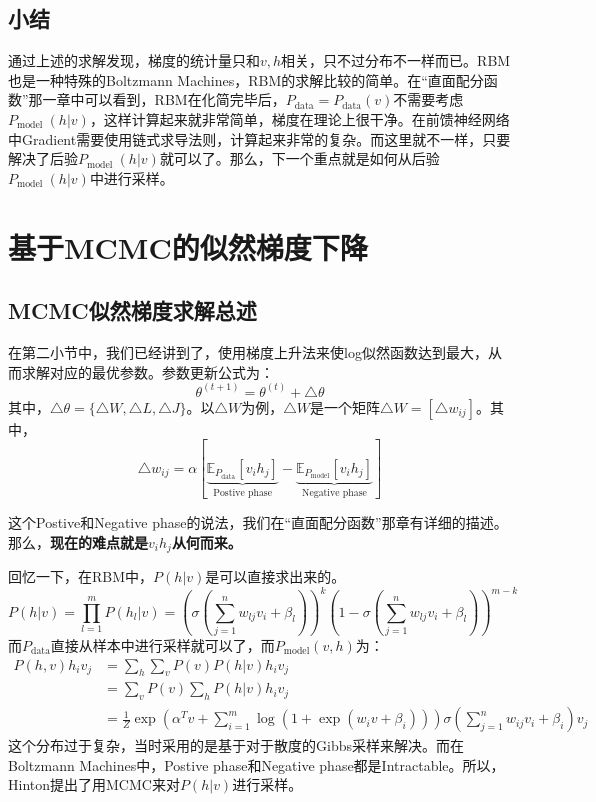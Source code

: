 \documentclass[a4paper]{article}
\begin{document}
\subsection{小结}
通过上述的求解发现，梯度的统计量只和$v,h$相关，只不过分布不一样而已。RBM也是一种特殊的Boltzmann Machines，RBM的求解比较的简单。在“直面配分函数”那一章中可以看到，RBM在化简完毕后，$P_{\text{data}} =P_{\text{data}} (v)$不需要考虑$P_{\text {model }}(h | v)$，这样计算起来就非常简单，梯度在理论上很干净。在前馈神经网络中Gradient需要使用链式求导法则，计算起来非常的复杂。而这里就不一样，只要解决了后验$P_{\text {model }}(h | v)$就可以了。那么，下一个重点就是如何从后验$P_{\text {model }}(h | v)$中进行采样。

\section{基于MCMC的似然梯度下降}
\subsection{MCMC似然梯度求解总述}
在第二小节中，我们已经讲到了，使用梯度上升法来使log似然函数达到最大，从而求解对应的最优参数。参数更新公式为：
\begin{equation}
    \theta^{(t+1)} = \theta^{(t)} + \triangle \theta
\end{equation}
其中，$\triangle \theta = \{ \triangle W, \triangle L, \triangle J \}$。以$\triangle W$为例，$\triangle W$是一个矩阵$\triangle W = [\triangle w_{ij}]$。其中，
\begin{equation}
    \triangle w_{ij} = \alpha \left[ \underbrace{\mathbb{E}_{P_{\text{data}}}[v_ih_j]}_{\text{Postive phase}} - \underbrace{\mathbb{E}_{P_{\text{model}}}[v_ih_j]}_{\text{Negative phase}} \right]
\end{equation}

这个Postive和Negative phase的说法，我们在“直面配分函数”那章有详细的描述。那么，\textbf{现在的难点就是$v_ih_j$从何而来。}

回忆一下，在RBM中，$P(h | v)$是可以直接求出来的。
\begin{equation}
P(h | v)=\prod_{l=1}^{m} P\left(h_{l} | v\right)=\left(\sigma\left(\sum_{j=1}^{n} w_{l j} v_{i}+\beta_{l}\right)\right)^{k}\left(1-\sigma\left(\sum_{j=1}^{n} w_{l j} v_{i}+\beta_{l}\right)\right)^{m-k}
\end{equation}
而$P_{\text{data}}$直接从样本中进行采样就可以了，而$P_{\text{model}}(v,h)$为：
\begin{equation}\begin{aligned}
P(h, v) h_{i} v_{j} &=\sum_{h} \sum_{v} P(v) P(h | v) h_{i} v_{j} \\
&=\sum_{v} P(v) \sum_{h} P(h | v) h_{i} v_{j} \\
&=\frac{1}{Z} \exp \left(\alpha^{T} v+\sum_{i=1}^{m} \log \left(1+\exp \left(w_{i} v+\beta_{i}\right)\right)\right) \sigma\left(\sum_{j=1}^{n} w_{i j} v_{i}+\beta_{i}\right) v_{j}
\end{aligned}\end{equation}
这个分布过于复杂，当时采用的是基于对于散度的Gibbs采样来解决。而在Boltzmann Machines中，Postive phase和Negative phase都是Intractable。所以，Hinton提出了用MCMC来对$P(h|v)$进行采样。
\end{document}

